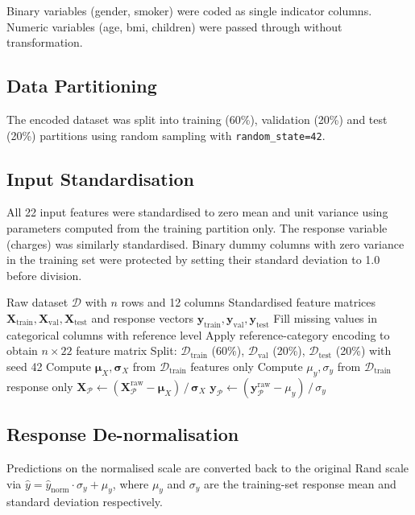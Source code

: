Binary variables (gender, smoker) were coded as single indicator columns. Numeric variables (age, bmi, children) were passed through without transformation.

\subsection{Data Partitioning}
\label{annexure:split}

The encoded dataset was split into training (60\%), validation (20\%) and test (20\%) partitions using random sampling with \texttt{random\_state=42}.

\subsection{Input Standardisation}
\label{annexure:standardisation}

All 22 input features were standardised to zero mean and unit variance using parameters computed from the training partition only. The response variable (charges) was similarly standardised. Binary dummy columns with zero variance in the training set were protected by setting their standard deviation to 1.0 before division.

\begin{algorithm}[htbp]
\caption{Data preprocessing and standardisation.}
\label{alg:preprocessing}
\begin{algorithmic}[1]
\Require Raw dataset $\mathcal{D}$ with $n$ rows and 12 columns
\Ensure Standardised feature matrices $\mathbf{X}_{\mathrm{train}}, \mathbf{X}_{\mathrm{val}}, \mathbf{X}_{\mathrm{test}}$ and response vectors $\mathbf{y}_{\mathrm{train}}, \mathbf{y}_{\mathrm{val}}, \mathbf{y}_{\mathrm{test}}$
\State Fill missing values in categorical columns with reference level
\State Apply reference-category encoding to obtain $n \times 22$ feature matrix
\State Split: $\mathcal{D}_{\mathrm{train}}$ (60\%), $\mathcal{D}_{\mathrm{val}}$ (20\%), $\mathcal{D}_{\mathrm{test}}$ (20\%) with seed 42
\State Compute $\boldsymbol{\mu}_X, \boldsymbol{\sigma}_X$ from $\mathcal{D}_{\mathrm{train}}$ features only
\State Compute $\mu_y, \sigma_y$ from $\mathcal{D}_{\mathrm{train}}$ response only
    \State $\mathbf{X}_{\mathcal{P}} \gets (\mathbf{X}_{\mathcal{P}}^{\mathrm{raw}} - \boldsymbol{\mu}_X) \,/\, \boldsymbol{\sigma}_X$
    \State $\mathbf{y}_{\mathcal{P}} \gets (\mathbf{y}_{\mathcal{P}}^{\mathrm{raw}} - \mu_y) \,/\, \sigma_y$
\EndFor
\end{algorithmic}
\end{algorithm}

\subsection{Response De-normalisation}
\label{annexure:denormalise}

Predictions on the normalised scale are converted back to the original Rand scale via $\hat{y} = \hat{y}_{\mathrm{norm}} \cdot \sigma_y + \mu_y$, where $\mu_y$ and $\sigma_y$ are the training-set response mean and standard deviation respectively.
